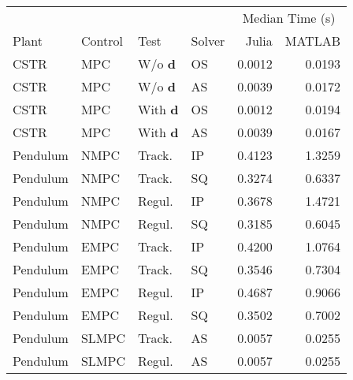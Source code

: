 \begin{tabular}{llllrr}
	
\toprule %

	  &	& & & \multicolumn{2}{c}{Median Time (s)} \\ \cmidrule(l){5-6}
Plant & Control & Test & Solver & Julia & MATLAB \\
\midrule %

CSTR		& MPC	& W/o $\mathbf{d}$	& OS & \num{0.0012} & \num{0.0193}	\\
CSTR		& MPC	& W/o $\mathbf{d}$	& AS & \num{0.0039} & \num{0.0172}	\\
CSTR		& MPC	& With $\mathbf{d}$ & OS & \num{0.0012} & \num{0.0194}	\\
CSTR		& MPC	& With $\mathbf{d}$ & AS & \num{0.0039} & \num{0.0167}	\\
Pendulum 	& NMPC	& Track. 	   		& IP & \num{0.4123} & \num{1.3259}	\\
Pendulum 	& NMPC	& Track. 	   		& SQ & \num{0.3274} & \num{0.6337}	\\
Pendulum    & NMPC	& Regul. 			& IP & \num{0.3678} & \num{1.4721} 	\\
Pendulum    & NMPC	& Regul. 			& SQ & \num{0.3185} & \num{0.6045} 	\\
Pendulum    & EMPC	& Track.			& IP & \num{0.4200} & \num{1.0764} 	\\
Pendulum    & EMPC	& Track.			& SQ & \num{0.3546} & \num{0.7304} 	\\
Pendulum	& EMPC	& Regul. 			& IP & \num{0.4687} & \num{0.9066} 	\\
Pendulum	& EMPC	& Regul. 			& SQ & \num{0.3502} & \num{0.7002}  \\
Pendulum    & SLMPC & Track.			& AS & \num{0.0057} & \num{0.0255}  \\
Pendulum    & SLMPC & Regul.			& AS & \num{0.0057} & \num{0.0255}  \\
	
\bottomrule %
	
\end{tabular}